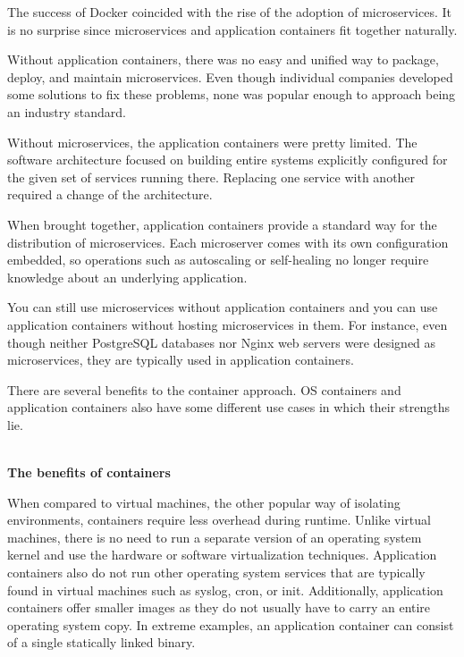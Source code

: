 
The success of Docker coincided with the rise of the adoption of microservices. It is no surprise since microservices and application containers fit together naturally.

Without application containers, there was no easy and unified way to package, deploy, and maintain microservices. Even though individual companies developed some solutions to fix these problems, none was popular enough to approach being an industry standard.

Without microservices, the application containers were pretty limited. The software architecture focused on building entire systems explicitly configured for the given set of services running there. Replacing one service with another required a change of the architecture.

When brought together, application containers provide a standard way for the distribution of microservices. Each microserver comes with its own configuration embedded, so operations such as autoscaling or self-healing no longer require knowledge about an underlying application.

You can still use microservices without application containers and you can use application containers without hosting microservices in them. For instance, even though neither PostgreSQL databases nor Nginx web servers were designed as microservices, they are typically used in application containers.


There are several benefits to the container approach. OS containers and application containers also have some different use cases in which their strengths lie.

\hspace*{\fill} \\ %
\noindent
\textbf{The benefits of containers}

When compared to virtual machines, the other popular way of isolating environments, containers require less overhead during runtime. Unlike virtual machines, there is no need to run a separate version of an operating system kernel and use the hardware or software virtualization techniques. Application containers also do not run other operating system services that are typically found in virtual machines such as syslog, cron, or init. Additionally, application containers offer smaller images as they do not usually have to carry an entire operating system copy. In extreme examples, an application container can consist of a single statically linked binary.

